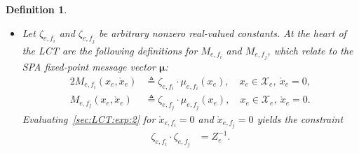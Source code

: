 \documentclass[journal]{IEEEtran}
\newcommand{\add}[1]{{\color{black}#1}}
\newtheorem{definition}[theorem]{Definition}
\newcommand{\vect}[1]{ \bm{#1} }
\newcommand{\set}[1]{\mathcal{#1}}
\newcommand{\xe}{ x_{e} }
\newcommand{\vmu}{ \vect{ \mu } }
\newcommand{\defeq}{ \triangleq }
\newcommand{\LCT}[1]{ \mathring{#1} }
\newcommand{\efi}{ e,f_i }
\newcommand{\efj}{ e,f_j }
\begin{document}
\begin{definition}
\begin{enumerate}
\begin{itemize}
            \item Let $\zeta_{\efi}$ and $\zeta_{\efj}$ be \add{arbitrary nonzero}
                  real-valued constants. At the heart of the LCT are the following definitions for
                  $M_{\efi}$ and $M_{\efj}$, which relate to the SPA fixed-point message vector $\vmu$:
                  \begin{alignat}{2}
                    M_{\efi}(\xe,\LCT{x}_e)
                     & \defeq \zeta_{\efi}
                    \cdot
                    \mu_{\efi}(\xe),
                    \quad x_e \in \set{X}_e, \ \LCT{x}_e = 0,
                    \label{sec:LCT:exp:3}  \\
                    M_{\efj}(\xe,\LCT{x}_e)
                     & \defeq \zeta_{\efj}
                    \cdot
                    \mu_{\efj}(\xe),
                    \quad x_e \in \set{X}_e, \ \LCT{x}_e = 0.
                    \label{sec:LCT:exp:4}
                  \end{alignat}
                  Evaluating~\eqref{sec:LCT:exp:2} for $\LCT{x}_{\efi} = 0$ and
                  $\LCT{x}_{\efj} = 0$ yields the constraint
                  \begin{align}
                    \zeta_{\efi}
                    \cdot
                    \zeta_{\efj}
                     & = Z_e^{-1}.
                    \label{sec:LCT:exp:5}
                  \end{align}


\end{itemize}
\end{enumerate}
\end{definition}
\end{document}
